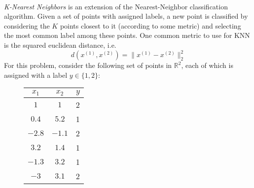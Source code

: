 \documentclass[oneside,11pt,letter]{article}
\begin{document}
\begin{enumerate}
\\

\textit{K-Nearest Neighbors} is an extension of the Nearest-Neighbor classification algorithm. Given a set of points with assigned labels, a new point is classified by considering the $K$ points closest to it (according to some metric) and selecting the most common label among these points. One common metric to use for KNN is the squared euclidean distance, i.e.
\begin{equation}
d(x^{(1)}, x^{(2)}) = \|x^{(1)} - x^{(2)}\|_2^2
\end{equation}
For this problem, consider the following set of points in $\mathbb{R}^2$, each of which is assigned with a label $y \in \{1, 2\}$:\\
\begin{figure}[h!]
\centering
\begin{tabular}{|c|c|c|}
\hline
$x_1$ & $x_2$ & $y$\\
\hline
$1$ & $1$ & 2\\
$0.4$ & $5.2$ & 1\\
$-2.8$ & $-1.1$ & 2\\
$3.2$ & $1.4$ & 1\\
$-1.3$ & $3.2$ & 1\\
$-3$ & $3.1$ & 2\\
\hline
\end{tabular}
\end{figure}
\begin{enumerate}
	
	\\
	
	\\
	

\end{enumerate}
\end{enumerate}
\end{document}
